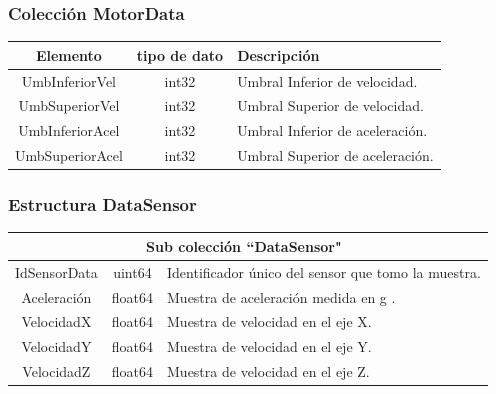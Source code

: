 \documentclass{beamer}
\begin{document}
\begin{frame}
    \frametitle{Colección MotorData}
    \begin{table}[ht]
        \begin{center}
            \begin{tabular}{|c|c|p{5cm}|}
                \hline
                Elemento        & tipo de dato & Descripción \\\hline\hline
                UmbInferiorVel  & int32  & Umbral Inferior de velocidad.\\\hline
                UmbSuperiorVel  & int32   & Umbral Superior de velocidad.\\\hline
                UmbInferiorAcel & int32   & Umbral Inferior de aceleración.\\\hline
                UmbSuperiorAcel & int32 & Umbral Superior de aceleración.\\\hline
            \end{tabular}
        \end{center}
    \end{table}
\end{frame}

\begin{frame}
    \frametitle{Estructura DataSensor}
    \begin{table}[ht]
        \begin{center}
            \begin{tabular}{|c|c|p{6cm}|}
                \hline
                \multicolumn{3}{|c|}{Sub colección  ``DataSensor"\ }\\\hline\hline
                IdSensorData & uint64 & Identificador único del sensor que tomo la muestra.\\\hline
                Aceleración  & float64 & Muestra de aceleración medida en g .\\\hline
                VelocidadX & float64 & Muestra de velocidad en el eje X.\\\hline
                VelocidadY & float64 & Muestra de velocidad en el eje Y.\\\hline
                VelocidadZ & float64 & Muestra de velocidad en el eje Z.\\
                \hline
            \end{tabular}
        \end{center}
    \end{table}
\end{frame}
\end{document}
